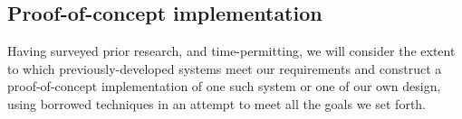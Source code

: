 \documentclass[10pt]{article}
\begin{document}
\begin{multicols}{2}
			\subsection{Proof-of-concept implementation}

				Having surveyed prior research, and time-permitting, we will consider the extent to which
				previously-developed systems meet our requirements and construct a proof-of-concept
				implementation of one such system or one of our own design, using borrowed techniques in
				an attempt to meet all the goals we set forth.

		{}
		

	\end{multicols}
\end{document}
